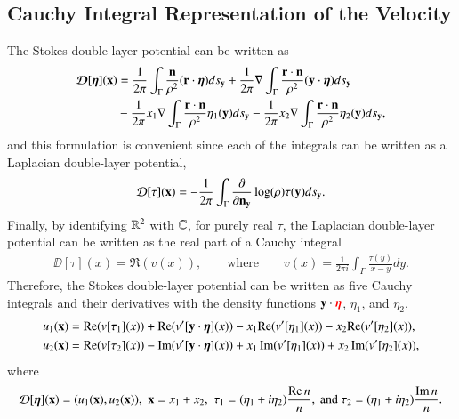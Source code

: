 \documentclass[preprint, 10pt]{elsarticle}
\begin{document}
\subsection{Cauchy Integral Representation of the Velocity}
The Stokes double-layer potential can be written as
\begin{align}
  {\boldsymbol{\mathcal D}}[{\boldsymbol\eta}]({\mathbf{x}}) &= 
    \frac{1}{2\pi} \int_{\Gamma} 
      \frac{{\mathbf{n}}}{\rho^2} ({\mathbf{r}} \cdot {\boldsymbol\eta}) ds_{\mathbf{y}} + 
    \frac{1}{2\pi} \nabla \int_{\Gamma}
      \frac{{\mathbf{r}} \cdot {\mathbf{n}}}{\rho^2} ({\mathbf{y}} \cdot {\boldsymbol\eta})ds_{\mathbf{y}} \\
    &- \frac{1}{2\pi} x_1 \nabla \int_{\Gamma}
      \frac{{\mathbf{r}} \cdot {\mathbf{n}}}{\rho^2}\eta_1({\mathbf{y}}) ds_{\mathbf{y}} -
    \frac{1}{2\pi} x_2 \nabla \int_{\Gamma}
      \frac{{\mathbf{r}} \cdot {\mathbf{n}}}{\rho^2}\eta_2({\mathbf{y}}) ds_{\mathbf{y}},
\end{align}
and this formulation is convenient since each of the integrals can be
written as a Laplacian double-layer potential,
\begin{align}
  {\mathcal{D}}[\tau]({\mathbf{x}}) = -\frac{1}{2\pi} \int_{\Gamma} \frac{\partial }{\partial {\mathbf{n}}_{\mathbf{y}}}
    \log(\rho) \tau({\mathbf{y}}) ds_{\mathbf{y}}.
\end{align}
Finally, by identifying ${\mathbb{R}}^2$ with ${\mathbb{C}}$, for purely real $\tau$, the
Laplacian double-layer potential can be written as the real part of a
Cauchy integral
\begin{align}
  \DD[\tau](x) = \Re (v(x)),
  \qquad \text{where} \qquad
  v(x) = \frac{1}{2\pi i} \int_\Gamma \frac{\tau(y)}{x - y} dy.
\end{align}
Therefore, the Stokes double-layer potential can be written as five
Cauchy integrals and their derivatives with the density functions ${\mathbf{y}}
\cdot {\color{red}{\boldsymbol\eta}}$, $\eta_1$, and $\eta_2,$
{\color{red}
\begin{align}
 u_1({\mathbf{x}})&= {\mathrm{Re}} (v[\tau_1](x)) + {\mathrm{Re}} (v'[{\mathbf{y}}\cdot{\boldsymbol\eta}](x)) 
           -x_1{\mathrm{Re}} (v'[\eta_1](x)) -x_2{\mathrm{Re}} (v'[\eta_2](x)),\\
 u_2({\mathbf{x}})&= {\mathrm{Re}} (v[\tau_2](x)) - \operatorname{Im} (v'[{\mathbf{y}}\cdot{\boldsymbol\eta}](x)) 
       +x_1\operatorname{Im} (v'[\eta_1](x)) 
      +x_2\operatorname{Im} (v'[\eta_2](x)),
\end{align}
where
\begin{align*} 
{\mathcal{D}}[{\boldsymbol\eta}]({\mathbf{x}})=(u_1({\mathbf{x}}),u_2({\mathbf{x}})), \,\, 
{\mathbf{x}}=x_1+x_2, \,\,
\tau_1=(\eta_1+i\eta_2)\frac{{\mathrm{Re}} \, n}{n}, \text{ and }
\tau_2=(\eta_1+i\eta_2)\frac{\operatorname{Im} n}{n}.
\end{align*}
}
\end{document}
